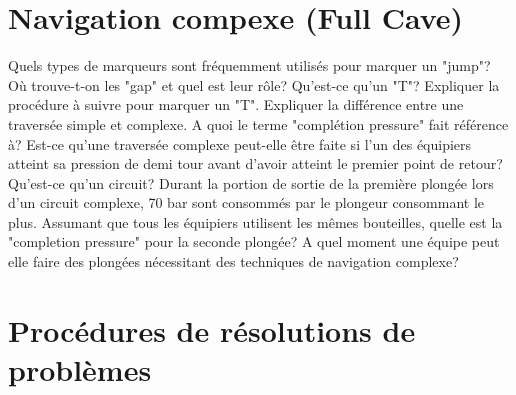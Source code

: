 \documentclass[english,1pt,a4paper]{article}
\begin{document}
	\section{Navigation compexe (Full Cave)}

	\begin{outline}
		\1 Quels types de marqueurs sont fréquemment utilisés pour marquer un "jump"?	\vspace{2cm}
		\1 Où trouve-t-on les "gap" et quel est leur rôle?	\vspace{2cm}
		\1 Qu’est-ce qu’un "T"?	\vspace{2cm}
		\1 Expliquer la procédure à suivre pour marquer un "T".	\vspace{2cm}
		\1 Expliquer la différence entre une traversée simple et complexe.	\vspace{2cm}
		\1 A quoi le terme "complétion pressure" fait référence à?	\vspace{2cm}
		\1 Est-ce qu’une traversée complexe peut-elle être faite si l’un des équipiers atteint sa pression de demi tour avant d’avoir atteint le premier point de retour?	\vspace{2cm}
		\1 Qu’est-ce qu’un circuit?	\vspace{2cm}
		\1 Durant la portion de sortie de la première plongée lors d’un circuit complexe, 70 bar sont consommés par le plongeur consommant le plus. Assumant que tous les équipiers utilisent les mêmes bouteilles, quelle est la "completion pressure"  pour la seconde plongée?	\vspace{2cm}
		\1 A quel moment une équipe peut elle faire des plongées nécessitant des techniques de navigation complexe?	\vspace{2cm}
	\end{outline}
	\pagebreak	

	\section{Procédures de résolutions de problèmes}
\end{document}
